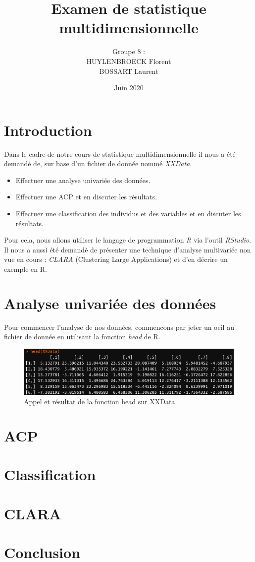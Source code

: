 \documentclass[12pt]{article}
\title{\huge Examen de statistique multidimensionnelle}
\author{Groupe 8 :\\
HUYLENBROECK Florent\\
BOSSART Laurent}
\date{Juin 2020}
\begin{document}
\maketitle
\newpage
\tableofcontents
\newpage
\section{Introduction}
Dans le cadre de notre cours de statistique multidimensionnelle il nous a été demandé de, sur base d'un fichier de donnée nommé \emph{XXData}.
\begin{itemize}
\item Effectuer une analyse univariée des données.
\item Effectuer une ACP et en discuter les résultats.
\item Effectuer une classification des individus et des variables et en discuter les résultats.
\end{itemize}
Pour cela, nous allons utiliser le langage de programmation \emph{R} via l'outil \emph{RStudio}.\\
Il nous a aussi été demandé de présenter une technique d'analyse multivariée non vue en cours : \emph{CLARA} (Clustering Large Applications) et d'en décrire un exemple en R.
\section{Analyse univariée des données}
Pour commencer l'analyse de nos données, commencons par jeter un oeil au fichier de donnée en utilisant la fonction \emph{head} de R.
\begin{figure}[h]
\centering
\includegraphics[scale=.75]{head.png}
\caption{Appel et résultat de la fonction head sur XXData}
\end{figure}
\section{ACP}
\section{Classification}
\section{CLARA}

\section{Conclusion}
\end{document}
